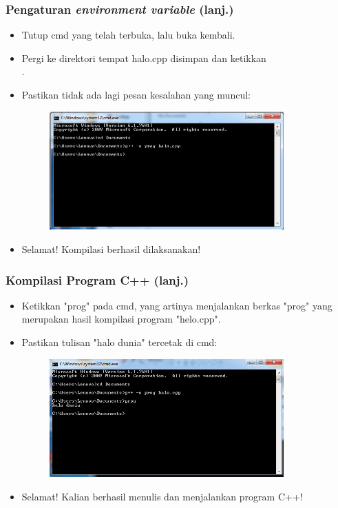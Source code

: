 \begin{frame}
\frametitle{Pengaturan \textit{environment variable} (lanj.)}
\begin{itemize}
  \item Tutup cmd yang telah terbuka, lalu buka kembali.
  \item Pergi ke direktori tempat halo.cpp disimpan dan ketikkan \\ \compilehelo.
  \item Pastikan tidak ada lagi pesan kesalahan yang muncul:
  \begin{figure}
    \includegraphics[width=9cm]{asset/cpp-compile-3.png}
  \end{figure}
  \item Selamat! Kompilasi berhasil dilaksanakan!
\end{itemize}
\end{frame}

\begin{frame}
\frametitle{Kompilasi Program C++ (lanj.)}
\begin{itemize}
  \item Ketikkan "prog" pada cmd, yang artinya menjalankan berkas "prog" yang merupakan hasil kompilasi program "helo.cpp".
  \item Pastikan tulisan "halo dunia" tercetak di cmd:
  \begin{figure}
    \includegraphics[width=9cm]{asset/cpp-compile-4.png}
  \end{figure}
  \item Selamat! Kalian berhasil menulis dan menjalankan program C++!
\end{itemize}
\end{frame}


